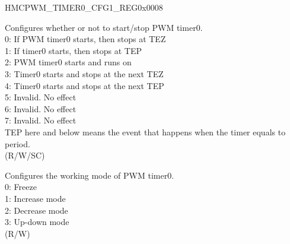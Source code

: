 \begin{register}{H}{MCPWM\_TIMER0\_CFG1\_REG}{0x0008}\label{regdesc:MCPWMTIMER0CFG1REG}
%
%
%
\regnewline%
\begin{regdesc}\begin{reglist}
\label{fielddesc:MCPWMTIMER0START}\item [MCPWM\_TIMER0\_START] Configures whether or not to start/stop PWM timer0. \\
0: If PWM timer0 starts, then stops at TEZ\\
1: If timer0 starts, then stops at TEP\\
2: PWM timer0 starts and runs on\\
3: Timer0 starts and stops at the next TEZ\\
4: Timer0 starts and stops at the next TEP\\
5: Invalid. No effect\\
6: Invalid. No effect\\
7: Invalid. No effect\\
TEP here and below means the event that happens when the timer equals to period. \\
(R/W/SC)
\label{fielddesc:MCPWMTIMER0MOD}\item [MCPWM\_TIMER0\_MOD] Configures the working mode of PWM timer0. 
\\0: Freeze
\\1: Increase mode
\\2: Decrease mode
\\3: Up-down mode
\\(R/W)
\end{reglist}\end{regdesc}
\end{register}


